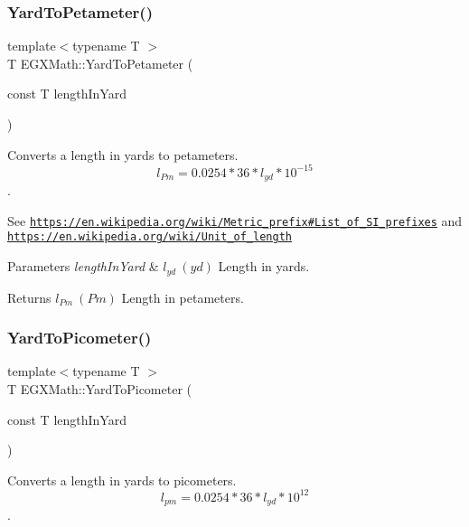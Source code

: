 \subsubsection{\texorpdfstring{Yard\+To\+Petameter()}{YardToPetameter()}}
{\footnotesize\ttfamily template$<$typename T $>$ \\
T E\+G\+X\+Math\+::\+Yard\+To\+Petameter (\begin{DoxyParamCaption}\item[{const T}]{length\+In\+Yard }\end{DoxyParamCaption})}



Converts a length in yards to petameters. \[ l_{Pm}=0.0254 * 36 * l_{yd} * 10^{-15} \]. 

See \href{https://en.wikipedia.org/wiki/Metric_prefix#List_of_SI_prefixes}{\tt https\+://en.\+wikipedia.\+org/wiki/\+Metric\+\_\+prefix\#\+List\+\_\+of\+\_\+\+S\+I\+\_\+prefixes} and \href{https://en.wikipedia.org/wiki/Unit_of_length}{\tt https\+://en.\+wikipedia.\+org/wiki/\+Unit\+\_\+of\+\_\+length} 
\begin{DoxyParams}{Parameters}
{\em length\+In\+Yard} & $ l_{yd}\ (yd)$ Length in yards. \\
\hline
\end{DoxyParams}
\begin{DoxyReturn}{Returns}
$ l_{Pm}\ (Pm)$ Length in petameters. 
\end{DoxyReturn}
\mbox{\label{group___e_g_x_math-_conversions-_length_conversions-_imperial-_yard-_s_i_ga1d0bc498fe3ed1693555aa6917abb758}} 
\subsubsection{\texorpdfstring{Yard\+To\+Picometer()}{YardToPicometer()}}
{\footnotesize\ttfamily template$<$typename T $>$ \\
T E\+G\+X\+Math\+::\+Yard\+To\+Picometer (\begin{DoxyParamCaption}\item[{const T}]{length\+In\+Yard }\end{DoxyParamCaption})}



Converts a length in yards to picometers. \[ l_{pm}=0.0254 * 36 * l_{yd} * 10^{12} \]. 

